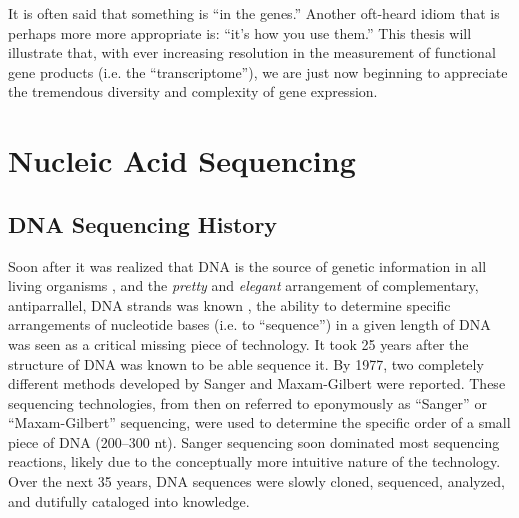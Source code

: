   It is often said that something is ``in the genes.'' Another oft-heard idiom that is perhaps more more appropriate is: ``it's how you use them.'' This thesis will illustrate that, with ever increasing resolution in the measurement of functional gene products (i.e. the ``transcriptome''), we are just now beginning to appreciate the tremendous diversity and complexity of gene expression.

\section{Nucleic Acid Sequencing}\label{Intro:sec:Nucleic Acid Sequencing}

  \subsection{DNA Sequencing History}\label{Intro:subsec:DNA Sequencing History}

    Soon after it was realized that DNA is the source of genetic information in all living organisms \citep{Watson1953a}, and the \textit{pretty} and \textit{elegant} arrangement of complementary, antiparrallel, DNA strands was known \citep{Watson2012a}, the ability to determine specific arrangements of nucleotide bases (i.e. to ``sequence'') in a given length of DNA was seen as a critical missing piece of technology. It took 25 years after the structure of DNA was known to be able sequence it. By 1977, two completely different methods developed by Sanger \citep{Sanger1975a,Sanger1977b} and Maxam-Gilbert \citep{Maxam1977a} were reported. These sequencing technologies, from then on referred to eponymously as ``Sanger'' or ``Maxam-Gilbert'' sequencing, were used to determine the specific order of a small piece of DNA (200–300 nt). Sanger sequencing soon dominated most sequencing reactions, likely due to the conceptually more intuitive nature of the technology. Over the next 35 years, DNA sequences were slowly cloned, sequenced, analyzed, and dutifully cataloged into knowledge.

